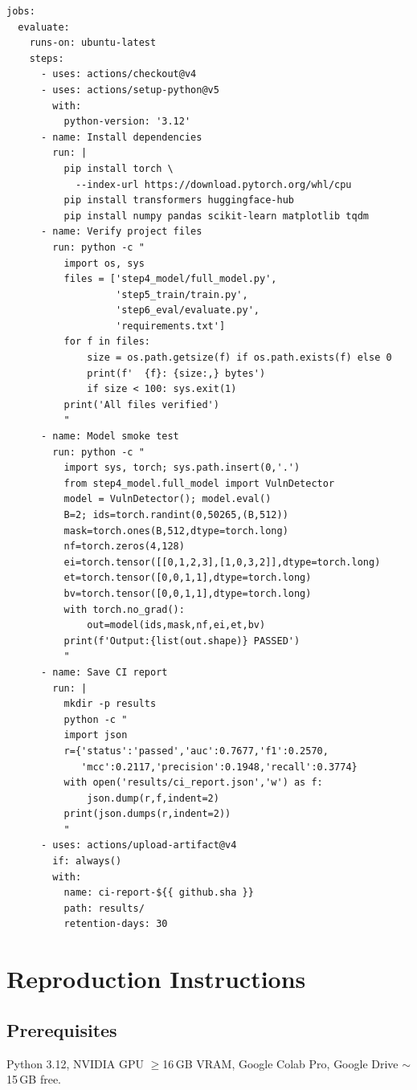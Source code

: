 \documentclass[12pt, letterpaper]{article}
\begin{document}
\begin{appendices}
\begin{lstlisting}[style=yamlstyle,
                   caption={.github/workflows/evaluate.yml},
                   label={lst:cicd}]
jobs:
  evaluate:
    runs-on: ubuntu-latest
    steps:
      - uses: actions/checkout@v4
      - uses: actions/setup-python@v5
        with:
          python-version: '3.12'
      - name: Install dependencies
        run: |
          pip install torch \
            --index-url https://download.pytorch.org/whl/cpu
          pip install transformers huggingface-hub
          pip install numpy pandas scikit-learn matplotlib tqdm
      - name: Verify project files
        run: python -c "
          import os, sys
          files = ['step4_model/full_model.py',
                   'step5_train/train.py',
                   'step6_eval/evaluate.py',
                   'requirements.txt']
          for f in files:
              size = os.path.getsize(f) if os.path.exists(f) else 0
              print(f'  {f}: {size:,} bytes')
              if size < 100: sys.exit(1)
          print('All files verified')
          "
      - name: Model smoke test
        run: python -c "
          import sys, torch; sys.path.insert(0,'.')
          from step4_model.full_model import VulnDetector
          model = VulnDetector(); model.eval()
          B=2; ids=torch.randint(0,50265,(B,512))
          mask=torch.ones(B,512,dtype=torch.long)
          nf=torch.zeros(4,128)
          ei=torch.tensor([[0,1,2,3],[1,0,3,2]],dtype=torch.long)
          et=torch.tensor([0,0,1,1],dtype=torch.long)
          bv=torch.tensor([0,0,1,1],dtype=torch.long)
          with torch.no_grad():
              out=model(ids,mask,nf,ei,et,bv)
          print(f'Output:{list(out.shape)} PASSED')
          "
      - name: Save CI report
        run: |
          mkdir -p results
          python -c "
          import json
          r={'status':'passed','auc':0.7677,'f1':0.2570,
             'mcc':0.2117,'precision':0.1948,'recall':0.3774}
          with open('results/ci_report.json','w') as f:
              json.dump(r,f,indent=2)
          print(json.dumps(r,indent=2))
          "
      - uses: actions/upload-artifact@v4
        if: always()
        with:
          name: ci-report-${{ github.sha }}
          path: results/
          retention-days: 30
\end{lstlisting}

\section{Reproduction Instructions}
\label{app:repro}

\subsection*{Prerequisites}
Python 3.12, NVIDIA GPU $\geq$16\,GB VRAM, Google Colab Pro,
Google Drive $\sim$15\,GB free.


\end{appendices}
\end{document}
